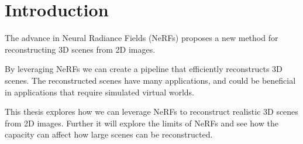 \chapter{Introduction}

The advance in Neural Radiance Fields (NeRFs) proposes a new method for reconstructing 3D scenes from 2D images.

By leveraging NeRFs we can create a pipeline that efficiently reconstructs 3D scenes. The reconstructed scenes have many applications, and could be beneficial in applications that require simulated virtual worlds.

This thesis explores how we can leverage NeRFs to reconstruct realistic 3D scenes from 2D images. Further it will explore the limits of NeRFs and see how the capacity can affect how large scenes can be reconstructed.



